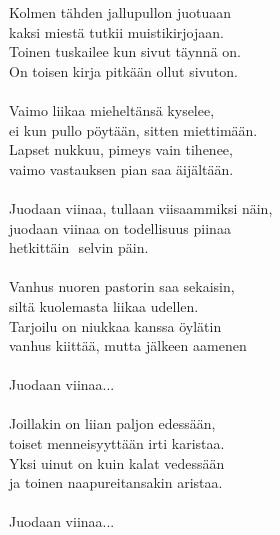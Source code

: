 
Kolmen tähden jallupullon juotuaan \\ kaksi miestä tutkii muistikirjojaan. \\ Toinen tuskailee kun sivut täynnä on. \\ On toisen kirja pitkään ollut sivuton. \\ \hspace{10mm} \\ Vaimo liikaa mieheltänsä kyselee, \\ ei kun pullo pöytään, sitten miettimään. \\ Lapset nukkuu, pimeys vain tihenee, \\ vaimo vastauksen pian saa äijältään. \\ \hspace{10mm} \\ Juodaan viinaa, tullaan viisaammiksi näin, \\ juodaan viinaa on todellisuus piinaa \\ hetkittäin  selvin päin. \\ \hspace{10mm} \\ Vanhus nuoren pastorin saa sekaisin, \\ siltä kuolemasta liikaa udellen. \\ Tarjoilu on niukkaa kanssa öylätin \\ vanhus kiittää, mutta jälkeen aamenen \\ \hspace{10mm} \\ Juodaan viinaa... \\ \hspace{10mm} \\ Joillakin on liian paljon edessään, \\ toiset menneisyyttään irti karistaa. \\ Yksi uinut on kuin kalat vedessään \\ ja toinen naapureitansakin aristaa. \\ \hspace{10mm} \\ Juodaan viinaa...